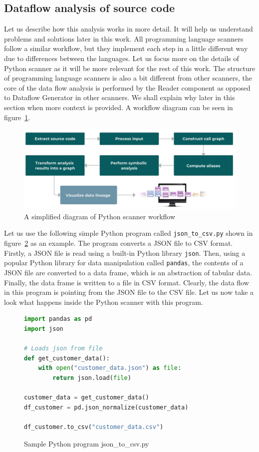 \subsection{Dataflow analysis of source code}

Let us describe how this analysis works in more detail. It will help us understand problems and solutions later in this work. All programming language scanners follow a similar workflow, but they implement each step in a little different way due to differences between the languages. Let us focus more on the details of Python scanner as it will be more relevant for the rest of this work. The structure of programming language scanners is also a bit different from other scanners, the core of the data flow analysis is performed by the Reader component as opposed to Dataflow Generator in other scanners. We shall explain why later in this section when more context is provided. A workflow diagram can be seen in figure~\ref{fig02:pythonWorkflow}.

\begin{figure}[ht]\centering
\includegraphics[width=1.0\textwidth]{img/python_workflow.PNG}
\caption{A simplified diagram of Python scanner workflow}
\label{fig02:pythonWorkflow}
\end{figure}  

Let us use the following simple Python program called \texttt{json\_to\_csv.py} shown in figure~\ref{fig:pythonSample} as an example. The program converts a JSON file to CSV format. Firstly, a JSON file is read using a built-in Python library \texttt{json}. Then, using a popular Python library for data manipulation called \texttt{pandas}, the contents of a JSON file are converted to a data frame, which is an abstraction of tabular data. Finally, the data frame is written to a file in CSV format. Clearly, the data flow in this program is pointing from the JSON file to the CSV file. Let us now take a look what happens inside the Python scanner with this program.

\begin{figure}[ht]
\begin{lstlisting}[language=Python] 
import pandas as pd
import json

# Loads json from file
def get_customer_data():
    with open("customer_data.json") as file:
        return json.load(file)

customer_data = get_customer_data()
df_customer = pd.json_normalize(customer_data)

df_customer.to_csv("customer_data.csv")
\end{lstlisting}
\caption{Sample Python program json\_to\_csv.py}
\label{fig:pythonSample}
\end{figure}

